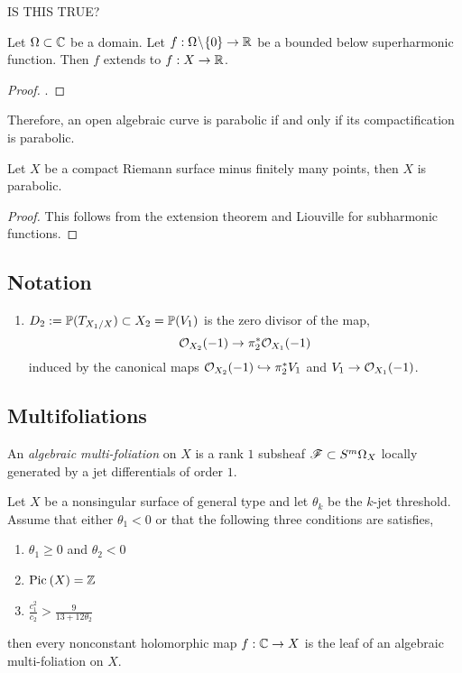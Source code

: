 \documentclass[12pt]{article}
\begin{document}
{\color{red} IS THIS TRUE?}

\begin{lemma}
Let $\Omega \subset \CC$ be a domain. Let $f : \Omega \sm \{ 0 \} \to \RR$ be a bounded below superharmonic function. Then $f$ extends to $f : X \to \RR$.
\end{lemma}

\begin{proof}
.
\end{proof}

Therefore, an open algebraic curve is parabolic if and only if its compactification is parabolic.

\begin{lemma}
Let $X$ be a compact Riemann surface minus finitely many points, then $X$ is parabolic.
\end{lemma}

\begin{proof}
This follows from the extension theorem and Liouville for subharmonic functions.
\end{proof}


\subsection{Notation}

\begin{enumerate}
\item $D_2 := \P(T_{X_1/X}) \subset X_2 = \P(V_1)$ is the zero divisor of the map,
\[ \struct{X_2}(-1) \to \pi_2^* \struct{X_1}(-1) \]
induced by the canonical maps $\struct{X_2}(-1) \embed \pi_2^* V_1$ and $V_1 \to \struct{X_1}(-1)$.
\end{enumerate}

\subsection{Multifoliations}

\begin{defn}
An \textit{algebraic multi-foliation} on $X$ is a rank $1$ subsheaf $\F \subset S^m \Omega_X$ locally generated by a jet differentials of order $1$.
\end{defn}

\begin{theorem}
Let $X$ be a nonsingular surface of general type and let $\theta_k$ be the $k$-jet threshold. Assume that either $\theta_1 < 0$ or that the following three conditions are satisfies,
\begin{enumerate}
\item $\theta_1 \ge 0$ and $\theta_2 < 0$
\item $\Pic{X} = \Z$
\item $\frac{c_1^2}{c_2} > \frac{9}{13 + 12 \theta_2}$
\end{enumerate}
then every nonconstant holomorphic map $f : \CC \to X$ is the leaf of an algebraic multi-foliation on $X$.
\end{theorem}
\end{document}
